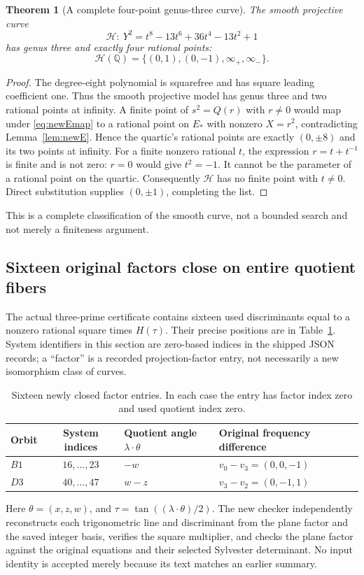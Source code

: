 \documentclass[11pt,letterpaper]{article}
\newtheorem{theorem}{Theorem}[section]
\theoremstyle{definition}\newtheorem{definition}[theorem]{Definition}
\theoremstyle{remark}\newtheorem{remark}[theorem]{Remark}
\newcommand{\Q}{\mathbb Q}\newcommand{\Z}{\mathbb Z}\newcommand{\R}{\mathbb R}
\begin{document}
\begin{theorem}[A complete four-point genus-three curve]\label{thm:newHpoints}
The smooth projective curve
\[
 \mathcal H:\ Y^2=t^8-13t^6+36t^4-13t^2+1
\]
has genus three and exactly four rational points:
\[
 \mathcal H(\Q)=\{(0,1),(0,-1),\infty_+,\infty_-\}.
\]
\end{theorem}
\begin{proof}
The degree-eight polynomial is squarefree and has square leading coefficient one. Thus the smooth projective model has genus three and two rational points at infinity. A finite point of $s^2=Q(r)$ with $r\ne0$ would map under \eqref{eq:newEmap} to a rational point on $E_*$ with nonzero $X=r^2$, contradicting Lemma~\ref{lem:newE}. Hence the quartic's rational points are exactly $(0,\pm8)$ and its two points at infinity. For a finite nonzero rational $t$, the expression $r=t+t^{-1}$ is finite and is not zero: $r=0$ would give $t^2=-1$. It cannot be the parameter of a rational point on the quartic. Consequently $\mathcal H$ has no finite point with $t\ne0$. Direct substitution supplies $(0,\pm1)$, completing the list.
\end{proof}
This is a complete classification of the smooth curve, not a bounded search and not merely a finiteness argument.

\subsection{Sixteen original factors close on entire quotient fibers}
The actual three-prime certificate contains sixteen used discriminants equal to a nonzero rational square times $H(\tau)$. Their precise positions are in Table~\ref{tab:newHfactors}. System identifiers in this section are zero-based indices in the shipped JSON records; a ``factor'' is a recorded projection-factor entry, not necessarily a new isomorphism class of curves.
\begin{table}[htbp]
\centering\small
\begin{tabular}{lcll}
\toprule
Orbit & System indices & Quotient angle $\lambda\cdot\theta$ & Original frequency difference\\
\midrule
$B1$ & $16,\ldots,23$ & $-w$ & $v_0-v_3=(0,0,-1)$\\
$D3$ & $40,\ldots,47$ & $w-z$ & $v_3-v_2=(0,-1,1)$\\
\bottomrule
\end{tabular}
\caption{Sixteen newly closed factor entries. In each case the entry has factor index zero and used quotient index zero.}\label{tab:newHfactors}
\end{table}
Here $\theta=(x,z,w)$, and $\tau=\tan((\lambda\cdot\theta)/2)$. The new checker independently reconstructs each trigonometric line and discriminant from the plane factor and the saved integer basis, verifies the square multiplier, and checks the plane factor against the original equations and their selected Sylvester determinant. No input identity is accepted merely because its text matches an earlier summary.
\end{document}

